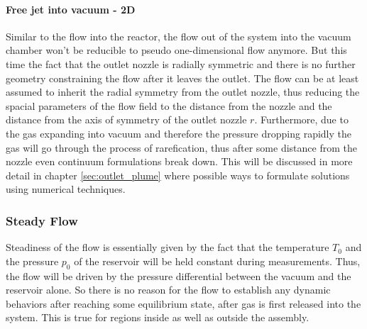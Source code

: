 	\paragraph{Free jet into vacuum - 2D}
		Similar to the flow into the reactor, the flow out of the system into the vacuum chamber won't be reducible to pseudo one-dimensional flow anymore.
		But this time the fact that the outlet nozzle is radially symmetric and there is no further geometry constraining the flow after it leaves the outlet.
		The flow can be at least assumed to inherit the radial symmetry from the outlet nozzle, thus reducing the spacial parameters of the flow field to the distance from the nozzle and the distance from the axis of symmetry of the outlet nozzle $r$.
		Furthermore, due to the gas expanding into vacuum and therefore the pressure dropping rapidly the gas will go through the process of rarefication, thus after some distance from the nozzle even continuum formulations break down.
		This will be discussed in more detail in chapter \ref{sec:outlet_plume} where possible ways to formulate solutions using numerical techniques.

	\cite{anderson2021modern}

\subsubsection*{Steady Flow}

	Steadiness of the flow is essentially given by the fact that the temperature $T_0$ and the pressure $p_0$ of the reservoir will be held constant during measurements.
	Thus, the flow will be driven by the pressure differential between the vacuum and the reservoir alone.
	So there is no reason for the flow to establish any dynamic behaviors after reaching some equilibrium state, after gas is first released into the system.
	This is true for regions inside as well as outside the assembly.
